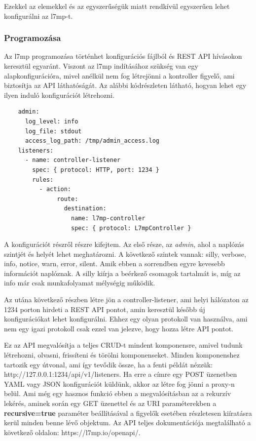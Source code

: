 Ezekkel az elemekkel és az egyszerűségük miatt rendkívül egyszerűen lehet konfigurálni
az l7mp-t. 

\subsubsection{Programozása}

Az l7mp programozása történhet konfigurációs fájlból és REST API hívásokon keresztül
egyaránt. Viszont az l7mp indításához szükség van egy alapkonfigurációra, mivel
anélkül nem fog létrejönni a kontroller figyelő, ami biztosítja az API 
láthatóságát. Az alábbi kódrészleten látható, hogyan lehet egy ilyen induló konfigurációt
létrehozni. 

\begin{lstlisting}
	admin:
      log_level: info
      log_file: stdout
      access_log_path: /tmp/admin_access.log
	listeners:
      - name: controller-listener
		spec: { protocol: HTTP, port: 1234 }
		rules:
		  - action:
			   route:
			     destination:
		           name: l7mp-controller
		           spec: { protocol: L7mpController }
\end{lstlisting}

A konfigurációt részről részre kifejtem. Az első része, az \textit{admin}, ahol
a naplózás szintjét és helyét lehet meghatározni. A következő szintek vannak:
silly, verbose, info, notice, warn, error, silent. Amik ebben a sorrendben
egyre kevesebb információt naplóznak. A silly kiírja a beérkező csomagok tartalmát
is, míg az info már csak munkafolyamat mélységig működik.

Az utána következő részben létre jön a controller-listener, ami helyi hálózaton az 
1234 porton hirdeti a REST API pontot, amin keresztül később új konfigurációkat lehet 
konfigurálni. Ehhez egy olyan protokoll van használva, ami nem egy igazi protokoll
csak ezzel van jelezve, hogy hozza létre API pontot. 

Ez az API megvalósítja a teljes CRUD-t mindent komponensre, amivel tudunk létrehozni, 
olvasni, frissíteni és törölni komponenseket. Minden komponenshez tartozik egy útvonal, 
ami így tevődik össze, ha a fenti példát nézzük: http://127.0.0.1:1234/api/v1/listeners.
Ha erre a címre egy POST üzenetben YAML vagy JSON konfigurációt küldünk, akkor az
létre fog jönni a proxy-n belül. Ami még egy hasznos funkció ebben a megvalósításban
az a rekurzív lekérés, aminek során egy GET üzenettel és az URI paraméterekben a 
\textbf{recursive=true} paraméter beállításával a figyelők esetében részletesen 
kiíratásra kerül minden benne lévő objektum. Az API teljes dokumentációja 
megtalálható a következő oldalon: https://l7mp.io/openapi/. \\

